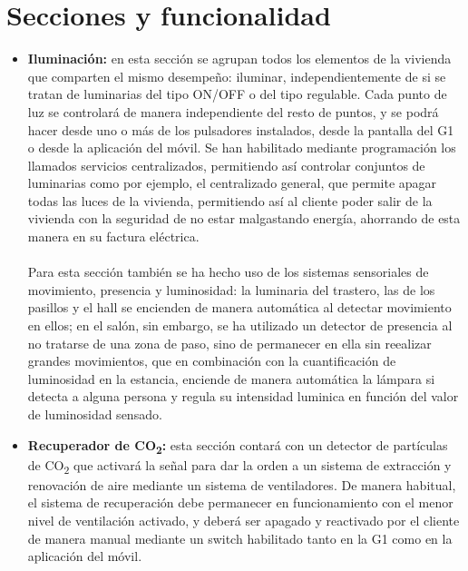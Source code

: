 \section{Secciones y funcionalidad}

\begin{itemize}
\item \textbf{Iluminación: }en esta sección se agrupan todos los elementos de la vivienda que comparten el mismo desempeño: iluminar, independientemente de si se tratan de luminarias del tipo ON/OFF o del tipo regulable. Cada punto de luz se controlará de manera independiente del resto de puntos, y se podrá hacer desde uno o más de los pulsadores instalados, desde la pantalla del G1 o desde la aplicación del móvil. Se han habilitado mediante programación los llamados servicios centralizados, permitiendo así controlar conjuntos de luminarias como por ejemplo, el centralizado general, que permite apagar todas las luces de la vivienda, permitiendo así al cliente poder salir de la vivienda con la seguridad de no estar malgastando energía, ahorrando de esta manera en su factura eléctrica. \\\\ Para esta sección también se ha hecho uso de los sistemas sensoriales de movimiento, presencia y luminosidad: la luminaria del trastero, las de los pasillos y el hall se encienden de manera automática al detectar movimiento en ellos; en el salón, sin embargo, se ha utilizado un detector de presencia al no tratarse de una zona de paso, sino de permanecer en ella sin reealizar grandes movimientos, que en combinación con la cuantificación de luminosidad en la estancia, enciende de manera automática la lámpara si detecta a alguna persona y regula su intensidad luminica en función del valor de luminosidad sensado.\\
\item \textbf{Recuperador de CO\textsubscript{2}: }esta sección contará con un detector de partículas de CO\textsubscript{2} que activará la señal para dar la orden a un sistema de extracción y renovación de aire mediante un sistema de ventiladores. De manera habitual, el sistema de recuperación debe permanecer en funcionamiento con el menor nivel de ventilación activado, y deberá ser apagado y reactivado por el cliente de manera manual mediante un switch habilitado tanto en la G1 como en la aplicación del móvil. \\ 

\end{itemize}
